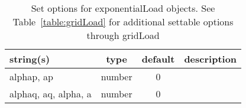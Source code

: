\begin{table}[ht]
\centering
\begin{tabular}{p{5cm} c c p{7cm}}
\hline
string(s) & type & default & description \\
\hline
alphap, ap & number & 0 & \\
alphaq, aq, alpha, a & number & 0 & \\
\hline
\end{tabular}
\caption{Set options for exponentialLoad objects. See Table~\ref{table:gridLoad} for additional settable options through gridLoad}
\label{table:exponentialLoad}
\end{table}
